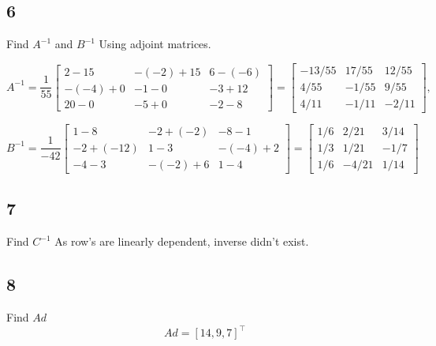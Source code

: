 \documentclass{article}
\begin{document}
\subsection*{6}
\begin{myleftlinebox}
    Find \(A^{-1}\) and \(B^{-1}\)
    \tcblower
    Using adjoint  matrices.

    \[
        A^{-1} =\frac{1}{55}\begin{bmatrix}
            2-15 & -(-2)+15 & 6-(-6)\\
            -(-4)+0 & -1-0 & -3+12\\
            20-0 & -5+0 & -2-8
        \end{bmatrix} = \begin{bmatrix}
            -13/55 & 17/55 & 12/55\\
            4/55 & -1/55 & 9/55\\
            4/11 & -1/11 & -2/11
        \end{bmatrix},
    \]

    \[
        B^{-1}	 = \frac{1}{-42}\begin{bmatrix}
            1-8 & -2+(-2) & -8-1\\
            -2+(-12) & 1-3 & -(-4)+2\\
            -4-3 & -(-2)+6 & 1-4
        \end{bmatrix} = \begin{bmatrix}
            1/6 & 2/21 & 3/14\\
            1/3 & 1/21 & -1/7\\
            1/6 & -4/21 & 1/14
        \end{bmatrix}
    \]
\end{myleftlinebox}

\subsection*{7}
\begin{myleftlinebox}
    Find \(C^{-1}\)
    \tcblower
    As row's are linearly dependent, inverse didn't exist. 

\end{myleftlinebox}

\subsection*{8}
\begin{myleftlinebox}
    Find \(Ad\)
    \tcblower
    \[
        Ad = [14,9,7]^\top
    \]
\end{myleftlinebox}
\end{document}
